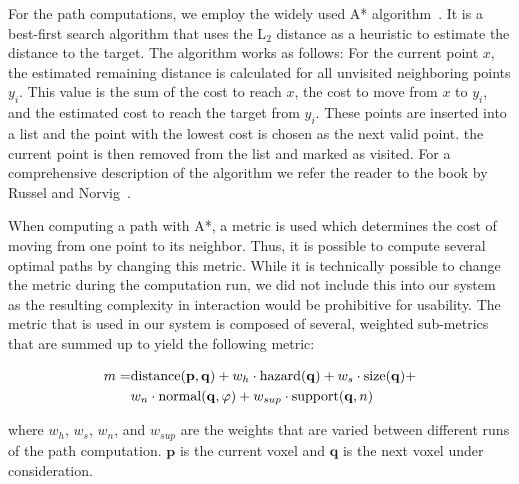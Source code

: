 \documentclass[review,journal]{vgtc}         %
\begin{document}
For the path computations, we employ the widely used A* algorithm~\cite{4082128}. It is a best-first search algorithm that uses the L$_2$ distance as a heuristic to estimate the distance to the target. The algorithm works as follows: For the current point $x$, the estimated remaining distance is calculated for all unvisited neighboring points $y_i$. This value is the sum of the cost to reach $x$, the cost to move from $x$ to $y_i$, and the estimated cost to reach the target from $y_i$. These points are inserted into a list and the point with the lowest cost is chosen as the next valid point. the current point is then removed from the list and marked as visited. For a comprehensive description of the algorithm we refer the reader to the book by Russel and Norvig~\cite{AStar}.

When computing a path with A*, a metric is used which determines the cost of moving from one point to its neighbor. Thus, it is possible to compute several optimal paths by changing this metric. While it is technically possible to change the metric during the computation run, we did not include this into our system as the resulting complexity in interaction would be prohibitive for usability. The metric that is used in our system is composed of several, weighted sub-metrics that are summed up to yield the following metric:

\begin{equation}
\begin{array}{r@{}l}
m = & \textrm{distance}(\mathbf{p},\mathbf{q}) + w_h \cdot \textrm{hazard}(\mathbf{q}) + w_s \cdot \textrm{size}(\mathbf{q}) + \vspace*{0.1cm} \\
  & w_n \cdot \textrm{normal}(\mathbf{q},\varphi) + w_{sup} \cdot \textrm{support}(\mathbf{q},n)
\end{array}
\end{equation}


\noindent where $w_h$, $w_s$, $w_n$, and $w_{sup}$ are the weights that are varied between different runs of the path computation. $\mathbf{p}$ is the current voxel and $\mathbf{q}$ is the next voxel under consideration.
\end{document}
